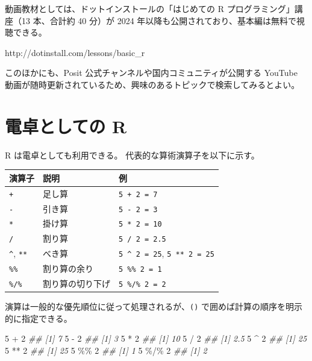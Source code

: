 \documentclass[
  letterpaper,
  xelatex,
  ja=standard, xelatex]{bxjsbook}
\newenvironment{Shaded}{\begin{snugshade}}{\end{snugshade}}
\newcommand{\DecValTok}[1]{\textcolor[rgb]{0.68,0.00,0.00}{#1}}
\newcommand{\DocumentationTok}[1]{\textcolor[rgb]{0.37,0.37,0.37}{\textit{#1}}}
\newcommand{\SpecialCharTok}[1]{\textcolor[rgb]{0.37,0.37,0.37}{#1}}
\begin{document}
動画教材としては、ドットインストールの「はじめての R
プログラミング」講座（13 本、合計約 40 分）が 2024
年以降も公開されており、基本編は無料で視聴できる。　

http://dotinstall.com/lessons/basic\_r

このほかにも、Posit 公式チャンネルや国内コミュニティが公開する YouTube
動画が随時更新されているため、興味のあるトピックで検索してみるとよい。

\section{電卓としての R}\label{ux96fbux5353ux3068ux3057ux3066ux306e-r}

R は電卓としても利用できる。 代表的な算術演算子を以下に示す。

\begin{longtable}[]{@{}lll@{}}
\toprule\noalign{}
演算子 & 説明 & 例 \\
\midrule\noalign{}
\endhead
\bottomrule\noalign{}
\endlastfoot
\texttt{+} & 足し算 & \texttt{5\ +\ 2\ =\ 7} \\
\texttt{-} & 引き算 & \texttt{5\ -\ 2\ =\ 3} \\
\texttt{*} & 掛け算 & \texttt{5\ *\ 2\ =\ 10} \\
\texttt{/} & 割り算 & \texttt{5\ /\ 2\ =\ 2.5} \\
\texttt{\^{}}, \texttt{**} & べき算 & \texttt{5\ \^{}\ 2\ =\ 25},
\texttt{5\ **\ 2\ =\ 25} \\
\texttt{\%\%} & 割り算の余り & \texttt{5\ \%\%\ 2\ =\ 1} \\
\texttt{\%/\%} & 割り算の切り下げ & \texttt{5\ \%/\%\ 2\ =\ 2} \\
\end{longtable}

演算は一般的な優先順位に従って処理されるが、\texttt{()}
で囲めば計算の順序を明示的に指定できる。

\begin{Shaded}
\begin{Highlighting}[]
\DecValTok{5} \SpecialCharTok{+} \DecValTok{2}
\DocumentationTok{\#\# [1] 7}
\DecValTok{5} \SpecialCharTok{{-}} \DecValTok{2}
\DocumentationTok{\#\# [1] 3}
\DecValTok{5} \SpecialCharTok{*} \DecValTok{2}
\DocumentationTok{\#\# [1] 10}
\DecValTok{5} \SpecialCharTok{/} \DecValTok{2}
\DocumentationTok{\#\# [1] 2.5}
\DecValTok{5} \SpecialCharTok{\^{}} \DecValTok{2}
\DocumentationTok{\#\# [1] 25}
\DecValTok{5} \SpecialCharTok{**} \DecValTok{2}
\DocumentationTok{\#\# [1] 25}
\DecValTok{5} \SpecialCharTok{\%\%} \DecValTok{2}
\DocumentationTok{\#\# [1] 1}
\DecValTok{5} \SpecialCharTok{\%/\%} \DecValTok{2}
\DocumentationTok{\#\# [1] 2}
\end{Highlighting}
\end{Shaded}
\end{document}

